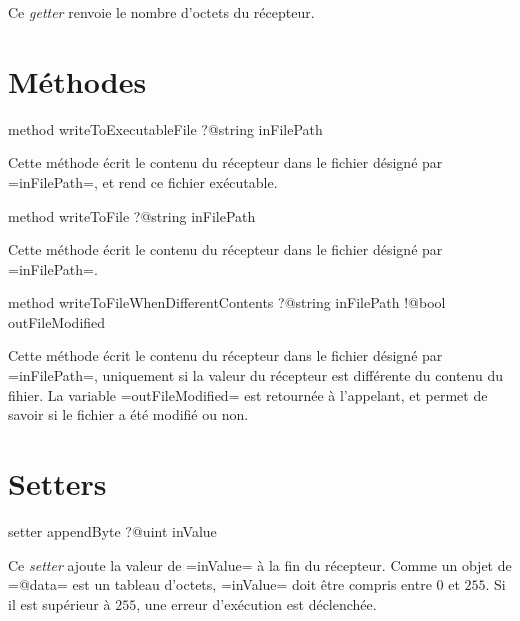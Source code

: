 Ce \emph{getter} renvoie le nombre d'octets du récepteur.





\section{Méthodes}



\begin{galgas}
method writeToExecutableFile ?@string inFilePath
\end{galgas}

Cette méthode écrit le contenu du récepteur dans le fichier désigné par \ggs=inFilePath=, et rend ce fichier exécutable.





\begin{galgas}
method writeToFile ?@string inFilePath
\end{galgas}

Cette méthode écrit le contenu du récepteur dans le fichier désigné par \ggs=inFilePath=.





\begin{galgas}
method writeToFileWhenDifferentContents
  ?@string inFilePath
  !@bool outFileModified
\end{galgas}

Cette méthode écrit le contenu du récepteur dans le fichier désigné par \ggs=inFilePath=, uniquement si la valeur du récepteur est différente du contenu du fihier. La variable \ggs=outFileModified= est retournée à l'appelant, et permet de savoir si le fichier a été modifié ou non.







\section{Setters}



\begin{galgas}
setter appendByte ?@uint inValue
\end{galgas}

Ce \emph{setter} ajoute la valeur de \ggs=inValue= à la fin du récepteur. Comme un objet de \ggs=@data= est un tableau d'octets, \ggs=inValue= doit être compris entre $0$ et $255$. Si il est supérieur à $255$, une erreur d'exécution est déclenchée.



